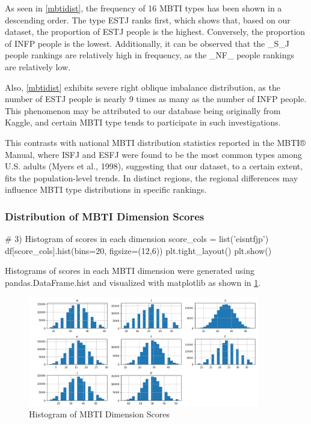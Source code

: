 \documentclass[12pt]{article}
\numberwithin{figure}{section}  %
\begin{document}
	As seen in \cref{mbtidist}, the frequency of 16 MBTI types has been shown
	in a descending order. The type ESTJ ranks first, which shows that, based on
	our dataset, the proportion of ESTJ people is the highest. Conversely, the
	proportion of INFP people is the lowest. Additionally, it can be observed
	that the \_S\_J people rankings are relatively high in frequency, as the
	\_NF\_ people rankings are relatively low.
	
	Also, \cref{mbtidist} exhibits severe right oblique imbalance distribution, as
	the number of ESTJ people is nearly 9 times as many as the number of INFP
	people. This phenomenon may be attributed to our database being originally
	from Kaggle, and certain MBTI type tends to participate in such
	investigations.
	
	This contrasts with national MBTI distribution statistics reported in the
	MBTI® Manual, where ISFJ and ESFJ were found to be the most common types
	among U.S. adults (Myers et al., 1998), suggesting that our dataset, to a
	certain extent, fits the population-level trends. In distinct regions, the
	regional differences may influence MBTI type distributions in specific
	rankings.
	
	\subsubsection{Distribution of MBTI Dimension Scores}
	
	\begin{python}
# 3) Histogram of scores in each dimension
score_cols = list('eisntfjp')
df[score_cols].hist(bins=20, figsize=(12,6))
plt.tight_layout()
plt.show()
	\end{python}
	
	Histograms of scores in each MBTI dimension were generated using
	pandas.DataFrame.hist and visualized with matplotlib as shown in \cref{mbtihisto}.
	\begin{figure}[H]
		\centering
		\includegraphics[width=0.9\textwidth]{Q1EDA4} 
		\caption{Histogram of MBTI Dimension Scores}
		\label{mbtihisto}		
	\end{figure}
	
\end{document}
